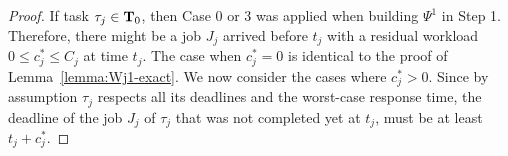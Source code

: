 \begin{proof}
If task $\tau_j \in {\bf T}_0$, then Case 0 or 3 was applied when building $\Psi^1$ in Step 1. %
  Therefore, there might be a job $J_j$ arrived before
  $t_j$ with a residual workload $0 \leq c_j^* \leq C_j$ at time
  $t_j$. %
  The case when $c_j^*=0$ is identical to the proof of Lemma~\ref{lemma:Wj1-exact}. We now consider the cases where $c_j^* > 0$.
  Since by assumption %
  $\tau_j$ respects all its deadlines and the
  worst-case response time, the deadline of the job $J_j$ of $\tau_j$ that was not completed yet at $t_j$, must be at least $t_j + c_j^*$. %

\end{proof}
